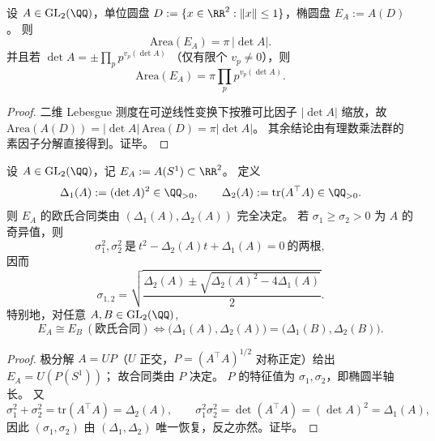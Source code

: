 \begin{theorem}[行列式素因子分解给出的椭圆面积守恒律]\label{thm:xi-terminal-ellipse-area-euler-prime-law}
设 \(A\in\mathrm{GL}_2(\QQ)\)，单位圆盘 \(D:=\{x\in\RR^2:\|x\|\le 1\}\)，椭圆盘 \(E_A:=A(D)\)。
则
\[
\mathrm{Area}(E_A)=\pi\,|\det A|.
\]
并且若
\(
\det A=\pm\prod_p p^{v_p(\det A)}
\)
（仅有限个 \(v_p\neq 0\)），则
\[
\mathrm{Area}(E_A)=\pi\prod_p p^{v_p(\det A)}.
\]
\end{theorem}
\begin{proof}
二维 Lebesgue 测度在可逆线性变换下按雅可比因子 \( |\det A| \) 缩放，故
\(
\mathrm{Area}(A(D))=|\det A|\,\mathrm{Area}(D)=\pi|\det A|
\)。
其余结论由有理数乘法群的素因子分解直接得到。证毕。
\end{proof}

\begin{theorem}[有理椭圆合同类的二元不变量完备性]\label{thm:xi-terminal-rational-ellipse-two-invariant-completeness}
设 \(A\in\mathrm{GL}_2(\QQ)\)，记 \(E_A:=A(S^1)\subset\RR^2\)。
定义
\[
\Delta_1(A):=(\det A)^2\in\QQ_{>0},
\qquad
\Delta_2(A):=\mathrm{tr}(A^\top A)\in\QQ_{>0}.
\]
则 \(E_A\) 的欧氏合同类由 \((\Delta_1(A),\Delta_2(A))\) 完全决定。
若 \(\sigma_1\ge \sigma_2>0\) 为 \(A\) 的奇异值，则
\[
\sigma_1^2,\sigma_2^2\ \text{是}\ t^2-\Delta_2(A)t+\Delta_1(A)=0\ \text{的两根},
\]
因而
\[
\sigma_{1,2}
=\sqrt{\frac{\Delta_2(A)\pm\sqrt{\Delta_2(A)^2-4\Delta_1(A)}}{2}}.
\]
特别地，对任意 \(A,B\in\mathrm{GL}_2(\QQ)\),
\[
E_A\cong E_B\ (\text{欧氏合同})
\Longleftrightarrow
\bigl(\Delta_1(A),\Delta_2(A)\bigr)=\bigl(\Delta_1(B),\Delta_2(B)\bigr).
\]
\end{theorem}
\begin{proof}
极分解 \(A=UP\)（\(U\) 正交，\(P=(A^\top A)^{1/2}\) 对称正定）给出
\(
E_A=U(P(S^1))
\)；
故合同类由 \(P\) 决定。
\(P\) 的特征值为 \(\sigma_1,\sigma_2\)，即椭圆半轴长。
又
\[
\sigma_1^2+\sigma_2^2=\mathrm{tr}(A^\top A)=\Delta_2(A),
\qquad
\sigma_1^2\sigma_2^2=\det(A^\top A)=(\det A)^2=\Delta_1(A),
\]
因此 \((\sigma_1,\sigma_2)\) 由 \((\Delta_1,\Delta_2)\) 唯一恢复，反之亦然。证毕。
\end{proof}



